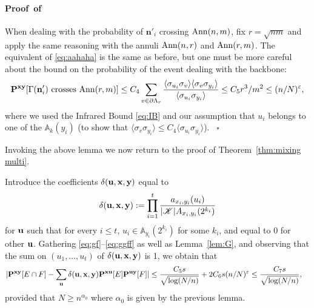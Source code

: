 \documentclass[a4paper,oneside,11pt]{article}
\newcommand{\be}[1]{\begin{equation}\label{#1}}
\newcommand{\ee}{\end{equation}}
\numberwithin{equation}{section}
\numberwithin{equation}{section}
\numberwithin{equation}{section}
\newenvironment{proof}[1][\relax]%
  {\paragraph{Proof\ifx#1\relax\else~of #1\fi}}%
  {~\hfill$\square$\par\bigskip}
\newcommand{\calK}{\mathcal{K}}
\newcommand{\bbA}{\mathbb{A}}
\def\be{\begin{equation}}
\def\ee{\end{equation}}
\newcommand{\ep}{\varepsilon}
\newcommand{\n}{\mathbf{n}}
\begin{document}
\begin{proof}
When dealing with the probability of $\n'_i$ crossing ${\rm Ann}(n,m)$, fix $r=\sqrt{nm}$ and apply the same reasoning with the annuli ${\rm Ann}(n,r)$ and ${\rm Ann}(r,m)$.
The equivalent of \eqref{eq:aahaha} is the same as before, but one must be more careful about the bound on the probability of the event dealing with the backbone:
\be\label{eq:B bound}
{\bf P}^{\bf xy}[\Gamma(\n_i')\text{ crosses }{\rm Ann}(r,m)]\le C_4\sum_{v\in \partial\Lambda_r}\frac{\langle\sigma_{u_i}\sigma_v\rangle\langle\sigma_v\sigma_{y_i}\rangle}{\langle\sigma_{u_i}\sigma_{y_i}\rangle}\le C_5r^3/m^2\le  (n/N)^\ep,
\ee
where we used the Infrared Bound \eqref{eq:IB} and  our assumption that $u_i$ belongs to one of the $\bbA_k(y_i)$ (to show that $\langle\sigma_v\sigma_{y_i}\rangle\le C_4\langle \sigma_{u_i}\sigma_{y_i}\rangle$).
  \end{proof}

Invoking the above lemma we now return  to the proof of Theorem~\ref{thm:mixing multi}. 

 Introduce the coefficients $\delta({\bf u}, {\bf x},{\bf y})$    equal to
\be
\delta({\bf u}, {\bf x},{\bf y}):=\prod_{i=1}^t\frac{a_{x_i,y_i}(u_i)}{|\calK| A_{x_i,y_i}(2^{k_i})}
\ee
for ${\bf u}$ such that for every $i\le t$, $u_i\in \bbA_{y_i}(2^{k_i})$ for some $k_i$, and equal to 0 for other ${\bf u}$.
Gathering \eqref{eq:gf}--\eqref{eq:ggff} as well as Lemma~\ref{lem:G}, and observing that the sum on $(u_1,\dots,u_t)$ of $\delta({\bf u},{\bf x},{\bf y})$ is 1, we obtain that 
 \begin{align}\label{eq:aaag}|{\bf P}^{{\bf xy}}[E\cap F]-\sum_{{\bf u}}\delta({\bf u},{\bf x},{\bf y}){\bf P}^{{\bf xu}}[E]{\bf P}^{\bf uy}[F]|&
\le \frac{C_5s}{\sqrt{\log(N/n)}}+2C_6s(n/N)^\ep\le \frac{C_7s}{\sqrt{\log(N/n)}},
\end{align}
provided that $N\ge n^{\alpha_0}$ where $\alpha_0$ is given by the previous lemma.
\end{document}
